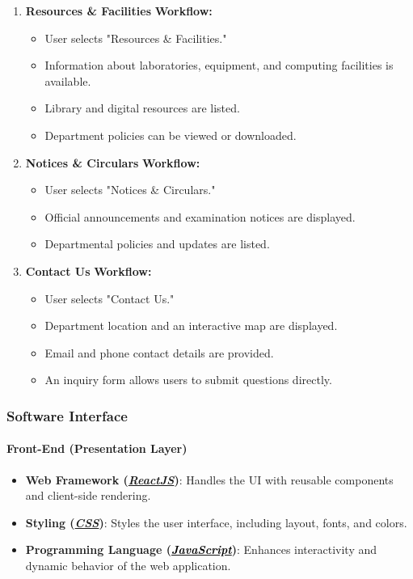 \documentclass[11pt]{article}
\newcommand{\JavaScript}{\href{https://www.javascript.com/}{\textbf{\colorbox{javascriptColor}{\textcolor{black}{\textit{JavaScript}}}}}}
\newcommand{\CSS}{\href{https://www.w3schools.com/css/}{\textbf{\textcolor{cssColor}{\textit{CSS}}}}}
\newcommand{\ReactJS}{\href{https://react.dev/}{\textbf{\textcolor{reactColor}{\textit{ReactJS}}}}}
\begin{document}
\begin{enumerate}
    \item \textbf{Resources \& Facilities}
    \textbf{Workflow:}
    \begin{itemize}
        \item User selects "Resources \& Facilities."
        \item Information about laboratories, equipment, and computing facilities is available.
        \item Library and digital resources are listed.
        \item Department policies can be viewed or downloaded.
    \end{itemize}

    \item \textbf{Notices \& Circulars}
    \textbf{Workflow:}
    \begin{itemize}
        \item User selects "Notices \& Circulars."
        \item Official announcements and examination notices are displayed.
        \item Departmental policies and updates are listed.
    \end{itemize}

    \item \textbf{Contact Us}
    \textbf{Workflow:}
    \begin{itemize}
        \item User selects "Contact Us."
        \item Department location and an interactive map are displayed.
        \item Email and phone contact details are provided.
        \item An inquiry form allows users to submit questions directly.
    \end{itemize}
\end{enumerate}

\subsubsection{Software Interface}
\paragraph{Front-End (Presentation Layer)}
\begin{itemize}
    \item \textbf{Web Framework (\ReactJS)}: Handles the UI with reusable components and client-side rendering.
    \item \textbf{Styling (\CSS)}: Styles the user interface, including layout, fonts, and colors.
    \item \textbf{Programming Language (\JavaScript)}: Enhances interactivity and dynamic behavior of the web application.
\end{itemize}
\end{document}
